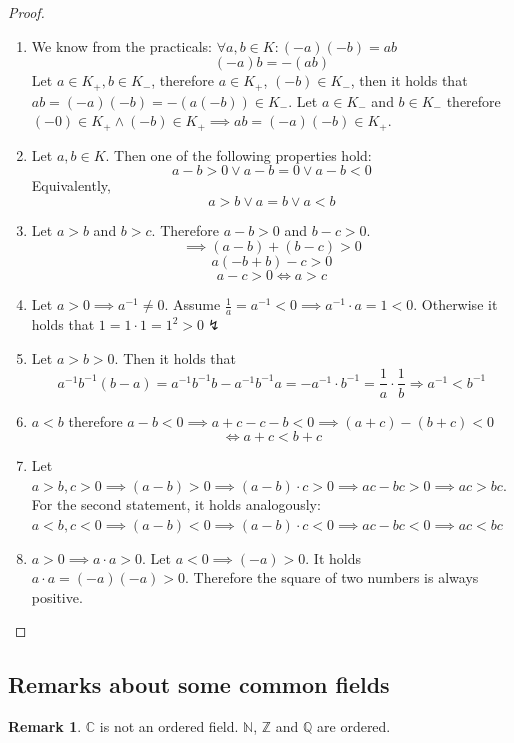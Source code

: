 \documentclass[a4paper,landscape,twocolumn]{article}
\theoremstyle{definition}
\newtheorem{rem}{Remark}
\begin{document}
\begin{proof}
  \begin{enumerate}
    \item We know from the practicals: $\forall a,b \in K: (-a)(-b) = ab$
      \[ (-a) b = -(ab) \]
      Let $a \in K_+, b \in K_-$, therefore $a \in K_+$, $(-b) \in K_-$,
      then it holds that $ab = (-a)(-b) = -(a(-b)) \in K_-$.
      Let $a \in K_-$ and $b \in K_-$ therefore $(-0) \in K_+ \land (-b) \in K_+
      \implies ab = (-a)(-b) \in K_+$.
    \item Let $a, b \in K$. Then one of the following properties hold:
      \[ a - b > 0 \lor a - b = 0 \lor a - b < 0 \]
      Equivalently,
      \[ a > b \lor a = b \lor a < b \]
    \item Let $a > b$ and $b > c$. Therefore $a - b > 0$ and $b - c > 0$.
      \[ \implies (a - b) + (b - c) > 0 \]
      \[ a(- b + b) - c > 0 \]
      \[ a - c > 0 \iff a > c \]
    \item Let $a > 0 \implies a^{-1} \neq 0$.
      Assume $\frac{1}{a} = a^{-1} < 0 \implies a^{-1} \cdot a = 1 < 0$.
      Otherwise it holds that $1 = 1 \cdot 1 = 1^2 > 0 \lightning$
    \item Let $a > b > 0$. Then it holds that
      \[
          a^{-1} b^{-1} (b - a)
          = a^{-1} b^{-1} b - a^{-1} b^{-1} a
          = -a^{-1} \cdot b^{-1}
          = \frac1a \cdot \frac1b
          \Rightarrow a^{-1} < b^{-1}
      \]
    \item $a < b$ therefore $a - b < 0 \implies a + c - c - b < 0 \implies (a + c) - (b + c) < 0$
      \[ \iff a + c < b + c \]
    \item Let $a > b, c > 0 \implies (a - b) > 0 \implies (a - b) \cdot c > 0 \implies ac - bc > 0
      \implies ac > bc$. For the second statement, it holds analogously:
      $a < b, c < 0 \implies (a - b) < 0 \implies (a - b) \cdot c < 0 \implies ac - bc < 0
        \implies ac < bc$
    \item $a > 0 \implies a \cdot a > 0$.
      Let $a < 0 \implies (-a) > 0$. It holds $a \cdot a = (-a)(-a) > 0$.
      Therefore the square of two numbers is always positive.
  \end{enumerate}
\end{proof}

\subsection{Remarks about some common fields}
\begin{rem}
  $\mathbb{C}$ is not an ordered field.
  $\mathbb{N}$, $\mathbb{Z}$ and $\mathbb{Q}$ are ordered.
\end{rem}
\end{document}
